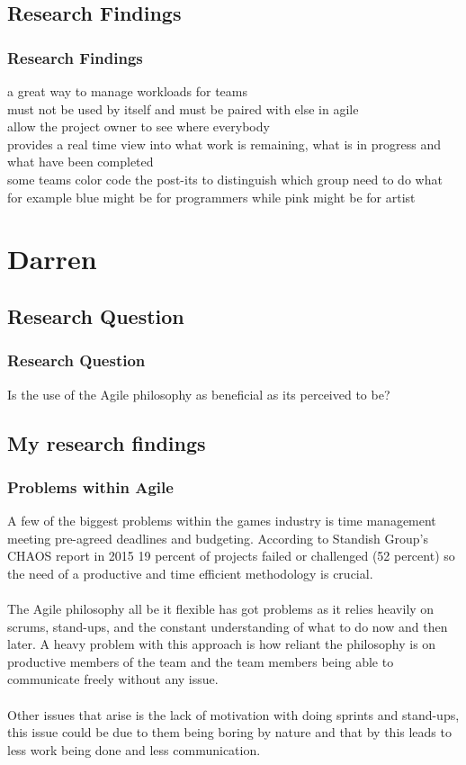 \documentclass{beamer}
\begin{document}
\subsection{Research Findings}
\begin{frame}
\frametitle{Research Findings}
a great way to manage workloads for teams\\
 must not be used by itself and must be paired with else in agile\\
 allow the project owner to see where everybody\\
 provides a real time view into what work is remaining, what is in progress and what have been completed\\
 some teams color code the post-its to distinguish which group need to do what for example blue might be for programmers while pink might be for artist\\
\end{frame}

\section{Darren}
\subsection{Research Question}
\begin{frame}
\frametitle{Research Question}
Is the use of the Agile philosophy as beneficial as its perceived to be?
\end{frame}
\subsection{My research findings}
\begin{frame}
\frametitle{Problems within Agile}
A few of the biggest problems within the games industry is time management meeting pre-agreed deadlines and budgeting. According to Standish Group's CHAOS report in 2015 19 percent of projects failed or challenged (52 percent) so the need of a productive and time efficient methodology is crucial. \\~\\

The Agile philosophy all be it flexible has got problems as it relies heavily on scrums, stand-ups, and the constant understanding of what to do now and then later. A heavy problem with this approach is how reliant the philosophy is on productive members of the team and the team members being able to communicate freely without any issue.\\~\\

Other issues that arise is the lack of motivation with doing sprints and stand-ups, this issue could be due to them being boring by nature and that by this leads to less work being done and less communication.
\end{frame}
\end{document}

